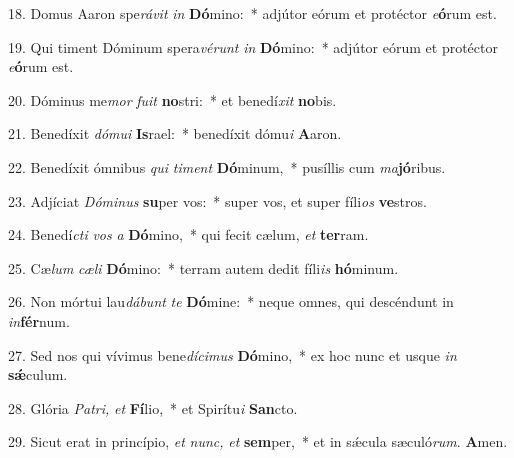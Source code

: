 \item 18. Domus Aaron spe\textit{rávit} \textit{in} \textbf{Dó}mino:~* adjútor eórum et protéctor \textit{e}\textbf{ó}rum est.
\item 19. Qui timent Dóminum spera\textit{vérunt} \textit{in} \textbf{Dó}mino:~* adjútor eórum et protéctor \textit{e}\textbf{ó}rum est.
\item 20. Dóminus me\textit{mor} \textit{fuit} \textbf{no}stri:~* et benedí\textit{xit} \textbf{no}bis.
\item 21. Benedíxit \textit{dómui} \textbf{Is}rael:~* benedíxit dómu\textit{i} \textbf{A}aron.
\item 22. Benedíxit ómnibus \textit{qui} \textit{timent} \textbf{Dó}minum,~* pusíllis cum \textit{ma}\textbf{jó}ribus.
\item 23. Adjíciat \textit{Dóminus} \textbf{su}per vos:~* super vos, et super fíli\textit{os} \textbf{ve}stros.
\item 24. Benedí\textit{cti} \textit{vos} \textit{a} \textbf{Dó}mino,~* qui fecit cælum, \textit{et} \textbf{ter}ram.
\item 25. Cæ\textit{lum} \textit{cæli} \textbf{Dó}mino:~* terram autem dedit fíli\textit{is} \textbf{hó}minum.
\item 26. Non mórtui lau\textit{dábunt} \textit{te} \textbf{Dó}mine:~* neque omnes, qui descéndunt in \textit{in}\textbf{fér}num.
\item 27. Sed nos qui vívimus bene\hspace{0.03em}\textit{dícimus} \textbf{Dó}mino,~* ex hoc nunc et usque \textit{in} \textbf{sǽ}culum.
\item 28. Glória \textit{Patri,} \textit{et} \textbf{Fí}lio,~* et Spirítu\hspace{0.03em}\textit{i} \textbf{San}cto.
\item 29. Sicut erat in princípio, \textit{et} \textit{nunc,} \textit{et} \textbf{sem}per,~* et in sǽcula sæculó\textit{rum}. \textbf{A}men.
